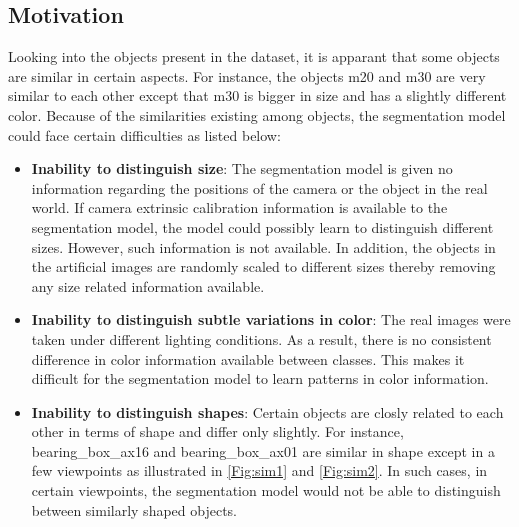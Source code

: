 	\subsection{Motivation}
		Looking into the objects present in the dataset, it is apparant that some objects are similar in certain aspects. For instance, the objects m20 and m30 are very similar to each other except that m30 is bigger in size and has a slightly different color. Because of the similarities existing among objects, the segmentation model could face certain difficulties as listed below:
		\begin{itemize}
			\item \textbf{Inability to distinguish size}: The segmentation model is given no information regarding the positions of the camera or the object in the real world. If camera extrinsic calibration information is available to the segmentation model, the model could possibly learn to distinguish different sizes. However, such information is not available. In addition, the objects in the artificial images are randomly scaled to different sizes thereby removing any size related information available.
			\item \textbf{Inability to distinguish subtle variations in color}: The real images were taken under different lighting conditions. As a result, there is no consistent difference in color information available between classes. This makes it difficult for the segmentation model to learn patterns in color information.
			\item \textbf{Inability to distinguish shapes}: Certain objects are closly related to each other in terms of shape and differ only slightly. For instance, bearing\_box\_ax16 and bearing\_box\_ax01 are similar in shape except in a few viewpoints as illustrated in \ref{Fig:sim1} and \ref{Fig:sim2}. In such cases, in certain viewpoints, the segmentation model would not be able to distinguish between similarly shaped objects.
			

\end{itemize}
